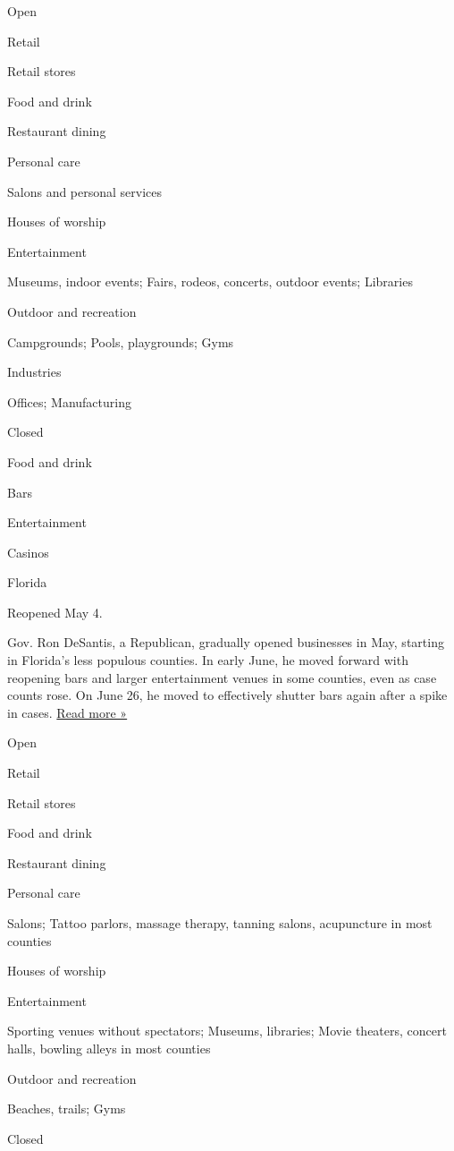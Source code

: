 Open

Retail

Retail stores

Food and drink

Restaurant dining

Personal care

Salons and personal services

Houses of worship

Entertainment

Museums, indoor events; Fairs, rodeos, concerts, outdoor events;
Libraries

Outdoor and recreation

Campgrounds; Pools, playgrounds; Gyms

Industries

Offices; Manufacturing

Closed

Food and drink

Bars

Entertainment

Casinos

Florida

Reopened May 4.

Gov. Ron DeSantis, a Republican, gradually opened businesses in May,
starting in Florida's less populous counties. In early June, he moved
forward with reopening bars and larger entertainment venues in some
counties, even as case counts rose. On June 26, he moved to effectively
shutter bars again after a spike in cases.
\href{https://www.tampabay.com/news/health/2020/06/26/drinking-alcohol-at-florida-bars-suspended/}{Read
more »}

Open

Retail

Retail stores

Food and drink

Restaurant dining

Personal care

Salons; Tattoo parlors, massage therapy, tanning salons, acupuncture in
most counties

Houses of worship

Entertainment

Sporting venues without spectators; Museums, libraries; Movie theaters,
concert halls, bowling alleys in most counties

Outdoor and recreation

Beaches, trails; Gyms

Closed


